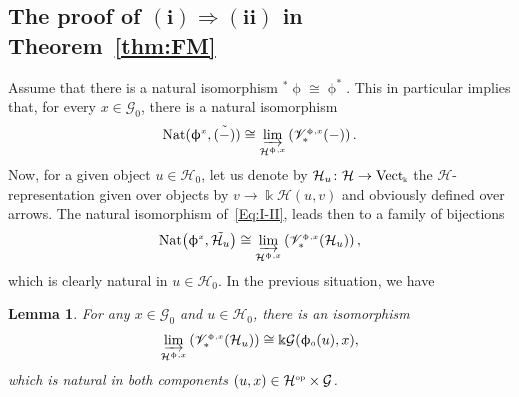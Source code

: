 \documentclass[pdftex]{sigma}
\numberwithin{equation}{section}
\newtheorem{Lemma}[Theorem]{Lemma}
\newcommand{\Vect}{{\rm Vect}_{\Sscript{\Bbbk}}}
\newcommand{\Go}{\cG_{\Sscript{0}}}
\newcommand{\Ho}{\cH_{\Sscript{0}}}
\newcommand{\vV}{\mathscr{V}}
\newcommand{\cG}{{\mathcal G}}
\newcommand{\cH}{{\mathcal H}}
\newcommand{\Sscript}[1]{\scriptscriptstyle{#1}}
\newcommand{\injlimit}[2]{\varinjlim_{#1}\left({#2}\right)}
\newcommand{\phio}{\upphi_{\Sscript{0}}}
\begin{document}
\subsection[The proof of $(i) \Rightarrow (ii)$ in Theorem~\ref{thm:FM}]{The proof of $\boldsymbol{(i) \Rightarrow (ii)}$ in Theorem~\ref{thm:FM}}\label{sssec:I-II}
Assume that there is a natural isomorphism ${}^{*}\upphi \cong \upphi^{*}$. This in particular implies that, for every $x \in \Go$, there is a natural isomorphism
\begin{gather}\label{Eq:I-II}
{\rm Nat}(\upphi^{\Sscript{x}}, \tilde{(-)}) \cong \injlimit{\cH^{\Sscript{\upphi, x}}}{\vV^{\Sscript{\upphi, x}}_*(-)}.
\end{gather}
Now, for a given object $u \in \Ho$, let us denote by $\cH_{u}\colon \cH \to \Vect$ the $\cH$-representation given over objects by $v \to \Bbbk \cH(u, v)$ and obviously defined over arrows. The natural isomorphism of~\eqref{Eq:I-II}, leads then to a family of bijections
\begin{gather*}
{\rm Nat}\big(\upphi^{\Sscript{x}}, \tilde{\cH_{u}}\big) \cong \injlimit{\cH^{\Sscript{\upphi, x}}}{\vV^{\Sscript{\upphi, x}}_*(\cH_{u})},
\end{gather*}
which is clearly natural in $u \in \Ho$. In the previous situation, we have
\begin{Lemma}\label{lema:I-II-1} For any $x \in\Go$ and $u \in \Ho$, there is an isomorphism
\begin{gather*}
\injlimit{\cH^{\Sscript{\upphi, x}}}{\vV^{\Sscript{\upphi,x}}_*(\cH_{u})} \cong \Bbbk \cG(\phio(u),x),
\end{gather*}
which is natural in both components $(u, x) \in \cH^{\Sscript{\rm op}} \times \cG$.
\end{Lemma}
\end{document}
